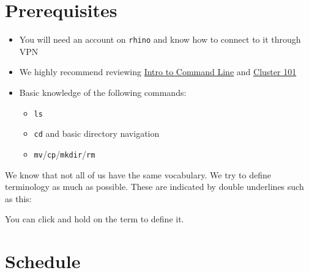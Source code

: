 \documentclass[
  letterpaper,
  DIV=11,
  numbers=noendperiod]{scrreprt}
\providecommand{\tightlist}{%
  \setlength{\itemsep}{0pt}\setlength{\parskip}{0pt}}
\begin{document}
\section*{Prerequisites}\label{prerequisites}


\begin{itemize}
\tightlist
\item
  You will need an account on \texttt{rhino} and know how to connect to
  it through VPN
\item
  We highly recommend reviewing
  \href{https://hutchdatascience.org/Intro_to_Command_Line/}{Intro to
  Command Line} and
  \href{https://hutchdatascience.org/FH_Cluster_101/}{Cluster 101}
\item
  Basic knowledge of the following commands:

  \begin{itemize}
  \tightlist
  \item
    \texttt{ls}
  \item
    \texttt{cd} and basic directory navigation
  \item
    \texttt{mv}/\texttt{cp}/\texttt{mkdir}/\texttt{rm}
  \end{itemize}
\end{itemize}

\begin{tcolorbox}[enhanced jigsaw, colbacktitle=quarto-callout-note-color!10!white, left=2mm, toprule=.15mm, toptitle=1mm, opacityback=0, bottomrule=.15mm, breakable, leftrule=.75mm, colframe=quarto-callout-note-color-frame, bottomtitle=1mm, titlerule=0mm, coltitle=black, title=\textcolor{quarto-callout-note-color}{\faInfo}\hspace{0.5em}{Terminology}, rightrule=.15mm, arc=.35mm, opacitybacktitle=0.6, colback=white]

We know that not all of us have the same vocabulary. We try to define
terminology as much as possible. These are indicated by double
underlines such as this:

You can click and hold on the term to define it.

\end{tcolorbox}

\section*{Schedule}\label{schedule}
\end{document}
